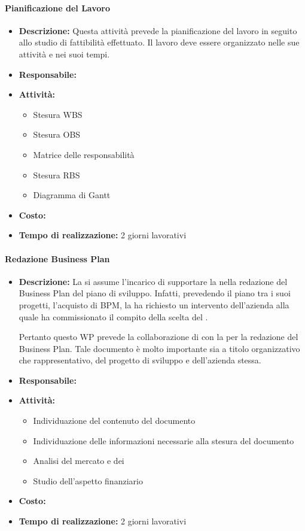 \paragraph{Pianificazione del Lavoro}
\begin{itemize}
\item{\bfseries Descrizione:} Questa attività prevede la pianificazione del lavoro in seguito allo studio di fattibilità effettuato. Il lavoro deve essere organizzato nelle sue attività e nei suoi tempi.
\item {\bfseries Responsabile:}
\item  {\bfseries Attività:}
	\begin{itemize}
		\item Stesura WBS
		\item Stesura OBS
		\item Matrice delle responsabilità
		\item Stesura RBS
		\item Diagramma di Gantt	
	\end{itemize}

\item  {\bfseries Costo:}
\item  {\bfseries Tempo di realizzazione:} 2 giorni lavorativi
\end{itemize}


\paragraph{Redazione Business Plan}
\begin{itemize}
\item{\bfseries Descrizione:} La \team si assume l'incarico di supportare la \customer nella redazione  del Business Plan del piano di sviluppo. Infatti, prevedendo il piano tra i suoi progetti, l'acquisto di 	\sw BPM, la \customer ha richiesto un intervento dell'azienda alla quale ha commissionato il compito della scelta del \sw.


Pertanto questo WP prevede la collaborazione di \team con la \customer per la redazione del Business Plan. Tale documento è molto importante sia a titolo organizzativo che rappresentativo, del progetto di sviluppo e dell'azienda stessa.
\item {\bfseries Responsabile:}
\item  {\bfseries Attività:}
		\begin{itemize}
		\item Individuazione del contenuto del documento
		\item Individuazione delle informazioni necessarie alla stesura del documento
		\item Analisi del mercato e dei 
		\item Studio dell'aspetto finanziario
	\end{itemize}
\item  {\bfseries Costo:}
\item  {\bfseries Tempo di realizzazione:} 2 giorni lavorativi
\end{itemize}


